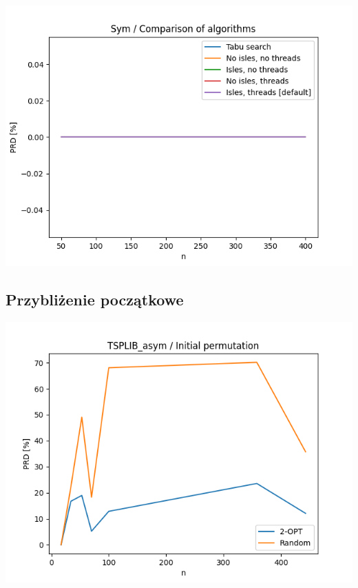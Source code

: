 \documentclass{article}
\begin{document}
\begin{center}
\includegraphics[width=\textwidth, 
                   height = 0.4\textheight, 
                   keepaspectratio]
                  {plots/sym_1_comparison} 
\end{center}


\subsection{Przybliżenie początkowe}

\begin{center}
\includegraphics[width=\textwidth, 
                   height = 0.4\textheight, 
                   keepaspectratio]
                  {plots/tsplib_asym_2_gen_rand} 
\end{center}
\end{document}
